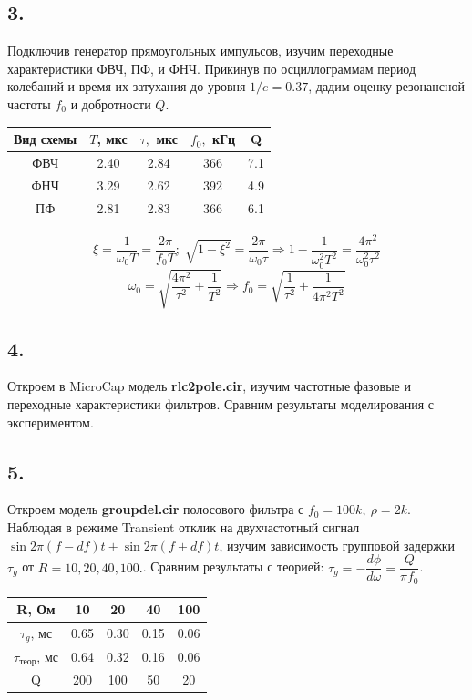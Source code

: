 \documentclass[a4paper, 12pt, twoside]{article}
\begin{document}
\subsection*{3.}
Подключив генератор прямоугольных импульсов, изучим переходные характеристики ФВЧ, ПФ, и ФНЧ. Прикинув по осциллограммам период колебаний и время их затухания до уровня $1/e = 0.37$, дадим оценку резонансной частоты $f_0$ и добротности $Q$.

\begin{table}[H] 
	\centering 
	
	\begin{tabular}{|c|c|c|c|c|} \hline
		
		Вид схемы & $T$, мкс & $\tau,$ мкс & $f_0,$ кГц & Q \\ \hline
		ФВЧ & 2.40 & 2.84 & 366 & 7.1 \\ \hline
		ФНЧ & 3.29 & 2.62 & 392 & 4.9 \\ \hline
		ПФ & 2.81 & 2.83 & 366 & 6.1 \\\hline 
	\end{tabular} 
\end{table} 
$$\xi=\frac{1}{\omega_0T}=\frac{2\pi}{f_0T};\; \sqrt{1-\xi^2}=\frac{2\pi}{\omega_0\tau}\Rightarrow1-\frac{1}{\omega_0^2T^2}=\frac{4\pi^2}{\omega_0^2\tau^2}$$ 
$$\omega_0=\sqrt{\frac{4\pi^2}{\tau^2}+\frac{1}{T^2}}\Rightarrow f_0=\sqrt{\frac{1}{\tau^2}+\frac{1}{4\pi^2T^2}}$$

\subsection*{4.}
Откроем в MicroCap модель \textbf{rlc2pole.cir}, изучим частотные фазовые и переходные характеристики фильтров. Сравним результаты моделирования с экспериментом.

\subsection*{5.}

Откроем модель \textbf{groupdel.cir} полосового фильтра с $f_0 = 100k, ~ \rho = 2k$. Наблюдая в режиме Transient отклик на двухчастотный сигнал $\sin 2\pi (f-df)t + \sin 2\pi(f + df)t$, изучим зависимость групповой задержки $\tau_{g}$ от $R = 10,20,40,100.$. Сравним результаты с теорией: $\tau_{g} = -\dfrac{d\phi}{d\omega} = \dfrac{Q}{\pi f_0}$.

\begin{table}[H]
	\centering
	
	
	\begin{tabular}{|c|c|c|c|c|}
		\hline
		R, Ом                    & 10   & 20   & 40   & 100  \\ \hline
		$\tau_g$, мс             & 0.65 & 0.30 & 0.15 & 0.06 \\ \hline
		$\tau_{\text{теор}}$, мс & 0.64 & 0.32 & 0.16 & 0.06 \\ \hline
		Q                        & 200  & 100  & 50   & 20   \\ \hline
	\end{tabular}
\end{table}
\end{document}
